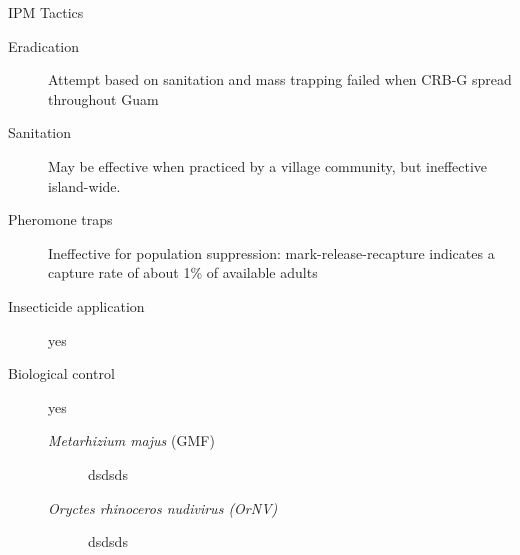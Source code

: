\documentclass[]{beamer}
\begin{document}
\begin{frame}{IPM Tactics}
	\begin{description}
		\item[Eradication]Attempt based on sanitation and mass trapping failed when CRB-G spread throughout Guam
		\item[Sanitation]May be effective when practiced by a village community, but ineffective island-wide.
		\item[Pheromone traps]Ineffective for population suppression: mark-release-recapture indicates a capture rate of about 1\% of available adults
		\item[Insecticide application]yes
		\item[Biological control]yes
				\begin{description}
					\item[\textit{Metarhizium majus} (GMF)] dsdsds
					\item[\textit{Oryctes rhinoceros nudivirus (OrNV)}] dsdsds
				\end{description}
				
	\end{description}
\end{frame}


%
%
%



\end{document}
